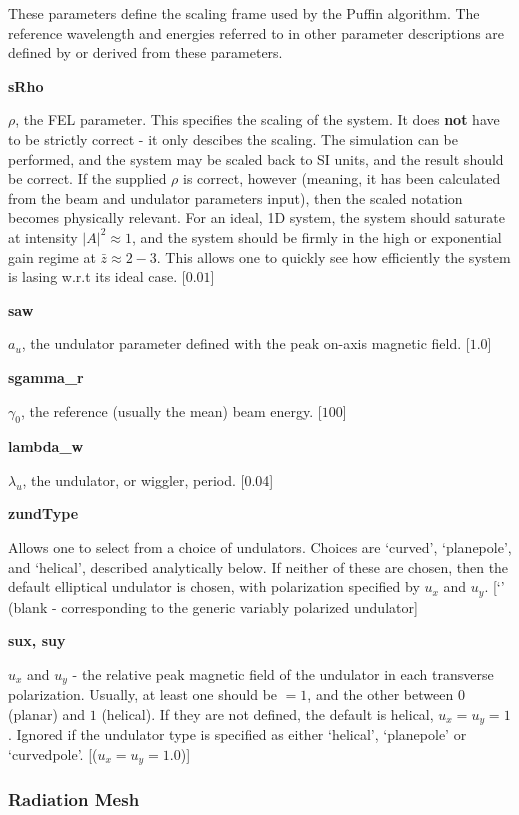 \documentclass[12pt]{article}%
\begin{document}
These parameters define the scaling frame used by the Puffin algorithm. The reference wavelength and energies referred to in other parameter descriptions are defined by or derived from these parameters.

{\bf sRho}

$\rho$, the FEL parameter. This specifies the scaling of the system. It does {\bf not} have to be strictly correct - it only descibes the scaling. The simulation can be performed, and the system may be scaled back to SI units, and the result should be correct. If the supplied $\rho$ is correct, however (meaning, it has been calculated from the beam and undulator parameters input), then the scaled notation becomes physically relevant. For an ideal, 1D system, the system should saturate at intensity $|A|^2 \approx 1$, and the system should be firmly in the high or exponential gain regime at $\bar{z} \approx 2-3$. This allows one to quickly see how efficiently the system is lasing w.r.t its ideal case. [$0.01$]

{\bf saw}

$a_u$, the undulator parameter defined with the peak on-axis magnetic field. [$1.0$]

{\bf sgamma\_r}

$\gamma_0$, the reference (usually the mean) beam energy. [$100$]

{\bf lambda\_w}

$\lambda_u$, the undulator, or wiggler, period. [0.04]

{\bf zundType}

Allows one to select from a choice of undulators. Choices are `curved', `planepole', and `helical', described analytically below. If neither of these are chosen, then the default elliptical undulator is chosen, with polarization specified by $u_x$ and $u_y$. [`' (blank - corresponding to the generic variably polarized undulator]

{\bf sux, suy}

$u_x$ and $u_y$ - the relative peak magnetic field of the undulator in each transverse polarization. Usually, at least one should be $=1$, and the other between $0$ (planar) and $1$ (helical). If they are not defined, the default is helical, $u_x=u_y=1$. Ignored if the undulator type is specified as either `helical', `planepole' or `curvedpole'. [($u_x = u_y = 1.0$)]


\subsubsection{Radiation Mesh}
\end{document}
